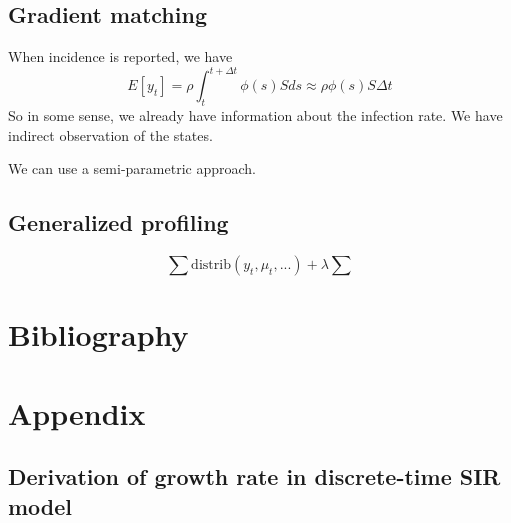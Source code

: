 \documentclass{article}
\begin{document}
\subsection{Gradient matching}

When incidence is reported, we have
\begin{equation}
E[y_t] = \rho \int_{t}^{t+\Delta t} \phi(s) S ds \approx \rho \phi(s) S \Delta t
\end{equation}
So in some sense, we already have information about the infection rate. 
We have indirect observation of the states.

We can use a semi-parametric approach.


\subsection{Generalized profiling}

\begin{equation}
\sum \mathrm{distrib}(y_t, \mu_t, ...) + \lambda \sum 
\end{equation}




\section{Bibliography}



\section{Appendix}

\subsection{Derivation of growth rate in discrete-time SIR model}
\end{document}

